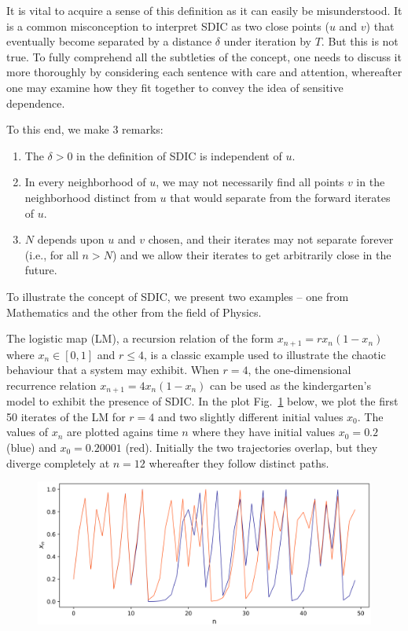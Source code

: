 It is vital to acquire a sense of this definition as it can easily be misunderstood. It is a common misconception to interpret SDIC as two close points ($u$ and $v$) that eventually become separated by a distance $\delta$ under iteration by $T$. But this is not true. To fully comprehend all the subtleties of the concept, one needs to discuss it more thoroughly by considering each sentence with care and attention, whereafter one may examine how they fit together to convey the idea of sensitive dependence. 

To this end, we make 3 remarks:
\vspace{-5mm}
\begin{enumerate}
  \item The $\delta>0$ in the definition of SDIC is independent of $u$. 
  \item In every neighborhood of $u$, we may not necessarily find all points $v$ in the neighborhood distinct from $u$ that would separate from the forward iterates of $u$. 
  \item  $N$ depends upon $u$ and $v$ chosen, and their iterates may not separate forever (i.e., for all $n>N$) and we allow their iterates to get arbitrarily close in the future. 
\end{enumerate}

To illustrate the concept of SDIC, we present two examples -- one from Mathematics and the other from the field of Physics.

\begin{Example}\label{ex_LM} \rm
  The logistic map (LM), a recursion relation of the form $x_{n+1}=rx_n(1-x_n)$ where $x_n\in[0,1]$ and $r\leq{4}$, is a classic example used to illustrate the chaotic behaviour that a system may exhibit. When $r=4$, the one-dimensional recurrence relation $x_{n+1}=4x_n(1-x_n)$ can be used as the kindergarten's model to exhibit the presence of SDIC.
  In the plot Fig.~\ref{fig:log_sdic} below, we plot the first 50 iterates of the LM for $r=4$ and two slightly different initial values $x_0$. 
  The values of $x_n$ are plotted agains time $n$  where they have initial values $x_0=0.2$ (blue) and $x_0=0.20001$ (red). Initially the two trajectories overlap, but they diverge completely at $n=12$ whereafter they follow distinct paths.

  \begin{figure}[ht]
    \includegraphics[scale=0.74]{Graphs/_logistic_sdic.eps}
        \centering
   \label{fig:log_sdic}
      \end{figure}
\end{Example}


